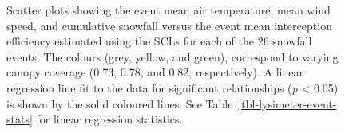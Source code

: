 \documentclass[
  letterpaper,
  DIV=11,
  numbers=noendperiod]{scrartcl}
\begin{document}
\begin{figure}[H]


\caption{\label{fig-scl-ip-avg-event}Scatter plots showing the event
mean air temperature, mean wind speed, and cumulative snowfall versus
the event mean interception efficiency estimated using the SCLs for each
of the 26 snowfall events. The colours (grey, yellow, and green),
correspond to varying canopy coverage (0.73, 0.78, and 0.82,
respectively). A linear regression line fit to the data for significant
relationships (\emph{p} \textless{} 0.05) is shown by the solid coloured
lines. See Table~\ref{tbl-lysimeter-event-stats} for linear regression
statistics.}

\end{figure}%
\end{document}

